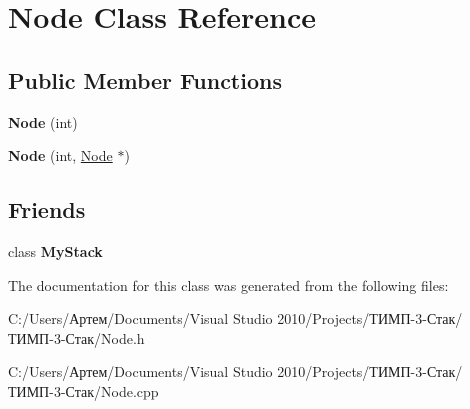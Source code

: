 \hypertarget{class_node}{}\section{Node Class Reference}
\label{class_node}
\subsection*{Public Member Functions}
\begin{DoxyCompactItemize}
\item 
\hypertarget{class_node_aff71d952af8363f046a67a8b12194e46}{}{\bfseries Node} (int)\label{class_node_aff71d952af8363f046a67a8b12194e46}

\item 
\hypertarget{class_node_aff31c12e14a6f00952a46ff967db0c96}{}{\bfseries Node} (int, \hyperlink{class_node}{Node} $\ast$)\label{class_node_aff31c12e14a6f00952a46ff967db0c96}

\end{DoxyCompactItemize}
\subsection*{Friends}
\begin{DoxyCompactItemize}
\item 
\hypertarget{class_node_a7525177702b2b7aa964013c361ff4735}{}class {\bfseries My\+Stack}\label{class_node_a7525177702b2b7aa964013c361ff4735}

\end{DoxyCompactItemize}


The documentation for this class was generated from the following files\+:\begin{DoxyCompactItemize}
\item 
C\+:/\+Users/Артем/\+Documents/\+Visual Studio 2010/\+Projects/ТИМП-\/3-\/Стак/ТИМП-\/3-\/Стак/Node.\+h\item 
C\+:/\+Users/Артем/\+Documents/\+Visual Studio 2010/\+Projects/ТИМП-\/3-\/Стак/ТИМП-\/3-\/Стак/Node.\+cpp\end{DoxyCompactItemize}
